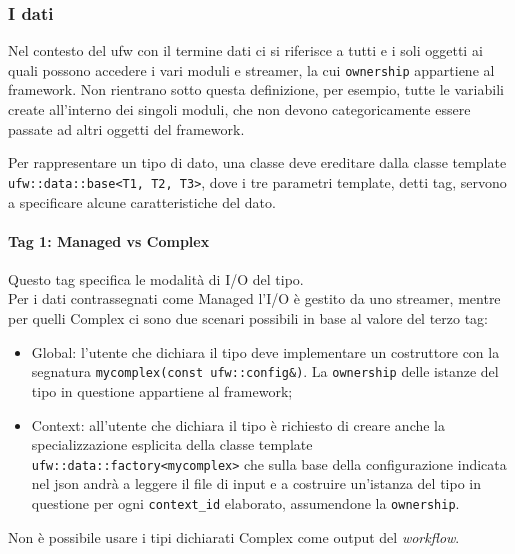 \documentclass[../../main.tex]{subfiles}
\begin{document}
  \subsubsection*{I dati}
    Nel contesto del ufw con il termine dati ci si riferisce a tutti e i
    soli oggetti ai quali possono accedere i vari moduli e streamer, la cui
    \texttt{ownership} appartiene al framework.
    Non rientrano sotto questa definizione, per esempio, tutte le variabili
    create all'interno dei singoli moduli, che non devono categoricamente
    essere passate ad altri oggetti del framework.

    Per rappresentare un tipo di dato, una classe deve ereditare dalla
    classe template \texttt{ufw::data::base<T1, T2, T3>}, dove i tre
    parametri template, detti tag, servono a specificare alcune
    caratteristiche del dato.

    \paragraph{Tag 1: Managed vs Complex}
      Questo tag specifica le modalità di I/O del tipo.\\
      Per i dati contrassegnati come Managed l'I/O è gestito da uno
      streamer, mentre per quelli Complex ci sono due scenari possibili in
      base al valore del terzo tag:
    \begin{itemize}
      \item Global: l'utente che dichiara il tipo deve implementare un
      costruttore con la segnatura
      \texttt{mycomplex(const ufw::config&)}.
      La \texttt{ownership} delle istanze del tipo in questione appartiene
      al framework;

      \item Context: all'utente che dichiara il tipo è richiesto di creare
      anche la specializzazione esplicita della classe template
      \texttt{ufw::data::factory<mycomplex>} che sulla
      base della configurazione indicata nel json andrà a leggere il file di
      input e a costruire un'istanza del tipo in questione per ogni
      \texttt{context\_id} elaborato, assumendone la \texttt{ownership}.
      \end{itemize}
      Non è possibile usare i tipi dichiarati Complex come output del
      \textit{workflow}.
\end{document}
